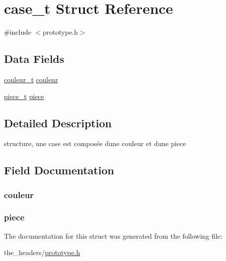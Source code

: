 \hypertarget{structcase__t}{}\section{case\+\_\+t Struct Reference}
\label{structcase__t}


{\ttfamily \#include $<$prototype.\+h$>$}

\subsection*{Data Fields}
\begin{DoxyCompactItemize}
\item 
\hyperlink{prototype_8h_a2fc0928aba15295ee980b903ed92f23f}{couleur\+\_\+t} \hyperlink{structcase__t_ab748ba7c53151f1ce902d5c52ea0c3e2}{couleur}
\item 
\hyperlink{prototype_8h_ab9be55f539b97c45fb9f57efded733c2}{piece\+\_\+t} \hyperlink{structcase__t_a755645c3b9ec06baca43cd4d6e984e54}{piece}
\end{DoxyCompactItemize}


\subsection{Detailed Description}
structure, une case est composée d\textquotesingle{}une couleur et d\textquotesingle{}une piece 

\subsection{Field Documentation}
\subsubsection[{\texorpdfstring{couleur}{couleur}}]{ couleur}\hypertarget{structcase__t_ab748ba7c53151f1ce902d5c52ea0c3e2}{}\label{structcase__t_ab748ba7c53151f1ce902d5c52ea0c3e2}
\subsubsection[{\texorpdfstring{piece}{piece}}]{ piece}\hypertarget{structcase__t_a755645c3b9ec06baca43cd4d6e984e54}{}\label{structcase__t_a755645c3b9ec06baca43cd4d6e984e54}


The documentation for this struct was generated from the following file\+:\begin{DoxyCompactItemize}
\item 
the\+\_\+headers/\hyperlink{prototype_8h}{prototype.\+h}\end{DoxyCompactItemize}
